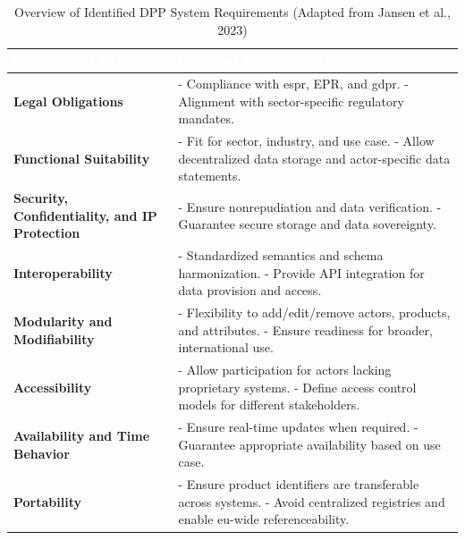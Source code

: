 \begin{table}[!ht]
    \centering
    \caption{Overview of Identified DPP System Requirements (Adapted from Jansen et al., 2023)}
    \renewcommand{\arraystretch}{1.5}
    \begin{tabularx}{\linewidth}{
        |>{\centering\arraybackslash}X
        |>{\arraybackslash}X|}
        \hline
        \cellcolor{myDarkBlue}\textcolor{white}{\textbf{Requirement Categories}} & 
        \cellcolor{myDarkBlue}\textcolor{white}{\textbf{Identified Requirements}} \\
        \hline
        \cellcolor{myGrey}\textbf{Legal Obligations} & 
        - Compliance with \ac{espr}, EPR, and \ac{gdpr}. \newline
        - Alignment with sector-specific regulatory mandates. \\
        \hline
        \cellcolor{myGrey}\textbf{Functional Suitability} & 
        - Fit for sector, industry, and use case. \newline
        - Allow decentralized data storage and actor-specific data statements. \\
        \hline
        \cellcolor{myGrey}\textbf{Security, Confidentiality, and IP Protection} & 
        - Ensure nonrepudiation and data verification. \newline
        - Guarantee secure storage and data sovereignty. \\
        \hline
        \cellcolor{myGrey}\textbf{Interoperability} & 
        - Standardized semantics and schema harmonization. \newline
        - Provide API integration for data provision and access. \\
        \hline
        \cellcolor{myGrey}\textbf{Modularity and Modifiability} & 
        - Flexibility to add/edit/remove actors, products, and attributes. \newline
        - Ensure readiness for broader, international use. \\
        \hline
        \cellcolor{myGrey}\textbf{Accessibility} & 
        - Allow participation for actors lacking proprietary systems. \newline
        - Define access control models for different stakeholders. \\
        \hline
        \cellcolor{myGrey}\textbf{Availability and Time Behavior} & 
        - Ensure real-time updates when required. \newline
        - Guarantee appropriate availability based on use case. \\
        \hline
        \cellcolor{myGrey}\textbf{Portability} & 
        - Ensure product identifiers are transferable across systems. \newline
        - Avoid centralized registries and enable \ac{eu}-wide referenceability. \\
        \hline
    \end{tabularx}
    \label{tab:dpp_requirements}
\end{table}

